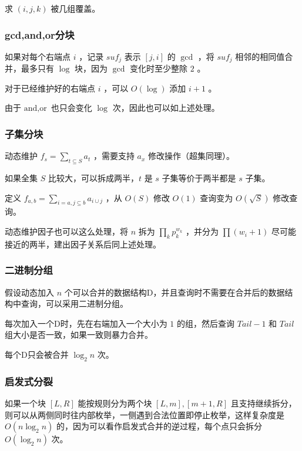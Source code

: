求 $(i,j,k)$ 被几组覆盖。




\newpage

\subsubsection{gcd,and,or分块}

如果对每个右端点 $i$ ，记录 $suf_j$ 表示 $[j,i]$ 的 $\gcd$ ，将 $suf_j$ 相邻的相同值合并，最多只有 $\log$ 块，因为 $\gcd$ 变化时至少整除 $2$ 。

对于已经维护好的右端点 $i$ ，可以 $O(\log)$ 添加 $i+1$ 。

由于 $\text{and},\text{or}$ 也只会变化 $\log$ 次，因此也可以如上述处理。

\subsubsection{子集分块}

动态维护 $f_s=\sum_{t\subseteq S}a_t$ ，需要支持 $a_x$ 修改操作（超集同理）。

如果全集 $S$ 比较大，可以拆成两半，$t$ 是 $s$ 子集等价于两半都是 $s$ 子集。

定义 $f_{a,b}=\sum_{i=a,j\subseteq b}a_{i\cup j}$ ，从 $O(S)$ 修改 $O(1)$ 查询变为 $O(\sqrt S)$ 修改查询。

动态维护因子也可以这么处理，将 $n$ 拆为 $\prod_{k}p_k^{w_k}$ ，并分为 $\prod(w_i+1)$ 尽可能接近的两半，建出因子关系后同上述处理。


\subsubsection{二进制分组}

假设动态加入 $n$ 个可以合并的数据结构D，并且查询时不需要在合并后的数据结构中查询，可以采用二进制分组。

每次加入一个D时，先在右端加入一个大小为 $1$ 的组，然后查询 $Tail-1$ 和 $Tail$ 组大小是否一致，如果一致则暴力合并。

每个D只会被合并 $\log_2n$ 次。

\subsubsection{启发式分裂}

如果一个块 $[L,R]$ 能按规则分为两个块 $[L,m],[m+1,R]$ 且支持继续拆分，则可以从两侧同时往内部枚举，一侧遇到合法位置即停止枚举，这样复杂度是 $O(n\log_2n)$ 的，因为可以看作启发式合并的逆过程，每个点只会拆分 $O(\log_2n)$ 次。


